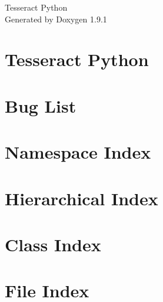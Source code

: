 \let\mypdfximage\pdfximage\def\pdfximage{\immediate\mypdfximage}\documentclass[twoside]{book}
\newcommand{\+}{\discretionary{\mbox{\scriptsize$\hookleftarrow$}}{}{}}
\newcommand{\clearemptydoublepage}{%
  \newpage{\pagestyle{empty}\cleardoublepage}%
}
\begin{document}
\raggedbottom

\hypersetup{pageanchor=false,
             bookmarksnumbered=true,
             pdfencoding=unicode
            }
\begin{titlepage}
\vspace*{7cm}
\begin{center}%
{\Large Tesseract Python }\\
\vspace*{1cm}
{\large Generated by Doxygen 1.9.1}\\
\end{center}
\end{titlepage}
\clearemptydoublepage
{}
\tableofcontents
\clearemptydoublepage
{}
\hypersetup{pageanchor=true}

\chapter{Tesseract Python}
\label{index}\hypertarget{index}{}
\chapter{Bug List}
\label{bug}

\chapter{Namespace Index}

\chapter{Hierarchical Index}

\chapter{Class Index}

\chapter{File Index}

\end{document}
